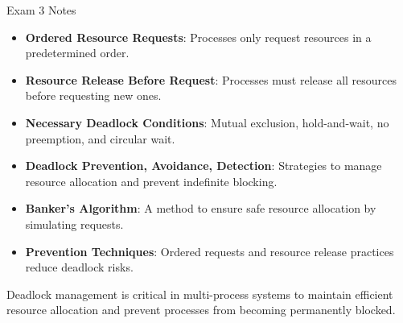 \begin{examnotes}{Exam 3 Notes}
    \begin{highlight}
        \begin{itemize}
            \item \textbf{Ordered Resource Requests}: Processes only request resources in a predetermined order.
            \item \textbf{Resource Release Before Request}: Processes must release all resources before requesting new ones.
        \end{itemize}
    \end{highlight}
    
    \begin{highlight}
        \begin{itemize}
            \item \textbf{Necessary Deadlock Conditions}: Mutual exclusion, hold-and-wait, no preemption, and circular wait.
            \item \textbf{Deadlock Prevention, Avoidance, Detection}: Strategies to manage resource allocation and prevent indefinite blocking.
            \item \textbf{Banker's Algorithm}: A method to ensure safe resource allocation by simulating requests.
            \item \textbf{Prevention Techniques}: Ordered requests and resource release practices reduce deadlock risks.
        \end{itemize}
    \end{highlight}
    
    Deadlock management is critical in multi-process systems to maintain efficient resource allocation and prevent processes from becoming permanently blocked.
\end{examnotes}

